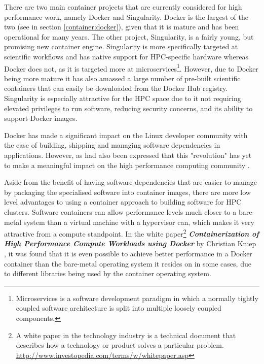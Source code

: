 There are two main container projects that are currently considered for high performance work, namely Docker and Singularity. Docker is the largest of the two (see  in section \ref{container:docker}), given that it is mature and has been operational for many years. The other project, Singularity, is a fairly young, but promising new container engine. Singularity is more specifically targeted at scientific workflows and has native support for HPC-specific hardware whereas Docker does not, as it is targeted more at microservices\footnote{Microservices is a software development paradigm in which a normally tightly coupled software architecture is split into multiple loosely coupled components.}. However, due to Docker being more mature it has also amassed a large number of pre-built scientific containers that can easily be downloaded from the Docker Hub registry. Singularity is especially attractive for the HPC space due to it not requiring elevated privileges to run software, reducing security concerns, and its ability to support Docker images.

Docker has made a significant impact on the Linux developer community with the ease of building, shipping and managing software dependencies in applications. However, as had also been expressed that this "revolution" \parencite{jacobsen2015contain} has yet to make a meaningful impact on the high performance computing community \parencite{yu2015building,xavier2013performance}.

Aside from the benefit of having software dependencies that are easier to manage by packaging the specialised software into container images, there are more low level advantages to using a container approach to building software for HPC clusters. Software containers can allow performance levels much closer to a bare-metal system than a virtual machine with a hypervisor can, which makes it very attractive from a compute standpoint. In the white paper\footnote{A white paper in the technology industry is a technical document that describes how a technology or product solves a particular problem. \url{http://www.investopedia.com/terms/w/whitepaper.asp}} \textbf{\textit{Containerization of High Performance Compute Workloads using Docker}} by Christian Kniep \parencite{kniep2014containerization}, it was found that it is even possible to achieve better performance in a Docker container than the bare-metal operating system it resides on in some cases, due to different libraries being used by the container operating system.

